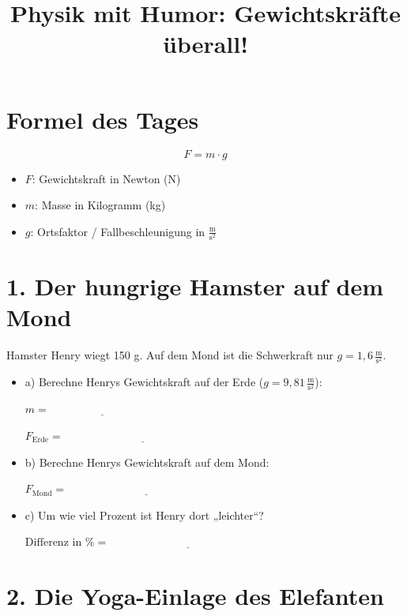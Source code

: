 \documentclass[a4paper,12pt]{article}
\title{Physik mit Humor: Gewichtskräfte überall!}
\date{}
\begin{document}
	
	
	\section*{Formel des Tages}
	
	\[
	F = m \cdot g
	\]
	\begin{itemize}
		\item \( F \): Gewichtskraft in Newton (N)
		\item \( m \): Masse in Kilogramm (kg)
		\item \( g \): Ortsfaktor / Fallbeschleunigung in \( \frac{\text{m}}{\text{s}^2} \)
	\end{itemize}
	
	\hrulefill
	
	\section{1. Der hungrige Hamster auf dem Mond }
	
  Hamster Henry wiegt 150 g. Auf dem Mond ist die Schwerkraft nur \( g = 1{,}6\, \frac{\text{m}}{\text{s}^2} \).
	
	\begin{itemize}
		\item a) Berechne Henrys Gewichtskraft auf der Erde (\( g = 9{,}81\, \frac{\text{m}}{\text{s}^2} \)):
		
		\vspace{1em}
		\( m = \underline{\hspace{4cm}} \)
		
		\( F_\text{Erde} = \underline{\hspace{6cm}} \)
		
		\item b) Berechne Henrys Gewichtskraft auf dem Mond:
		
		\vspace{1em}
		\( F_\text{Mond} = \underline{\hspace{6cm}} \)
		
		\item c) Um wie viel Prozent ist Henry dort „leichter“?
		
		\vspace{1em}
		\( \text{Differenz in \%} = \underline{\hspace{6cm}} \)
	\end{itemize}
	
	\hrulefill
	
	\section*{2. Die Yoga-Einlage des Elefanten }
	
\end{document}
